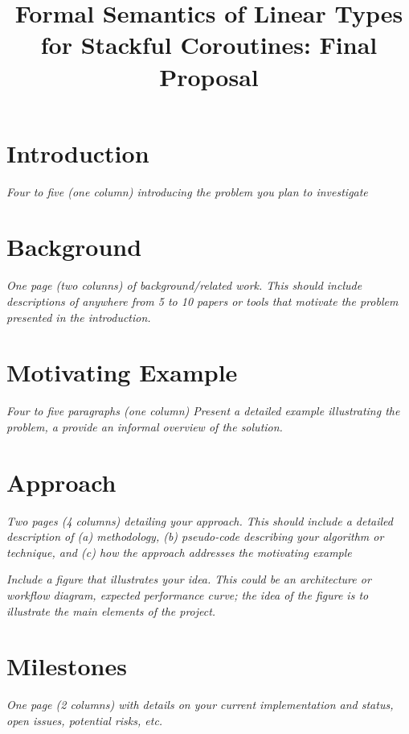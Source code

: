 \documentclass[review,twocolumn,preprint]{sigplanconf}
\begin{document}
\title{Formal Semantics of Linear Types for Stackful Coroutines: Final Proposal}
\date{}

\maketitle


\section{Introduction}

\emph{Four to five \citep{krust2018} (one column) introducing the problem you
  plan to investigate}


\section{Background}

\emph{One page (two colunns) of background/related work.  This should
  include descriptions of anywhere from 5 to 10 papers or tools that motivate
  the  problem presented in the introduction.}


\section{Motivating Example}

\emph{Four to five paragraphs (one column) Present a detailed example
  illustrating the problem, a provide an informal overview of the
  solution.}

\section{Approach}

\emph{Two pages (4 columns) detailing your approach.  This should
  include a detailed description of (a) methodology, (b) pseudo-code
  describing your algorithm or technique, and (c) how the approach
  addresses the motivating example}

\emph{Include a figure that illustrates your idea.  This could be an
  architecture or workflow diagram, expected performance curve; the
  idea of the figure is to illustrate the main elements of the project.}

\section{Milestones}

\emph{One page (2 columns) with details on your current implementation
  and status, open issues, potential risks, etc.}


\end{document}
